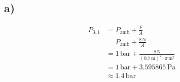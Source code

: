 

\subsection*{a)}

\begin{align*}
P_{3,1} &= P_{\text{amb}} + \frac{F}{A} \\
        &= P_{\text{amb}} + \frac{8 \, \text{N}}{A} \\
        &= 1 \, \text{bar} + \frac{8 \, \text{N}}{(0.7 \, \text{m})^2 \cdot \pi \, \text{m}^2} \\
        &= 1 \, \text{bar} + 3.595865 \, \text{Pa} \\
        &\approx 1.4 \, \text{bar}
\end{align*}